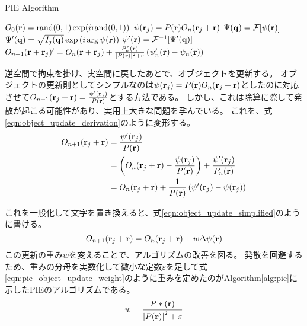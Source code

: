 \begin{algorithm}                      
\caption{PIE Algorithm}         
\label{alg:pie}                          
\begin{algorithmic}
    \STATE $O_0(\mathbf{r}) = \mathrm{rand}(0,1) \exp(i \mathrm{rand}(0,1) )$
        \STATE $\psi(\mathbf{r}_j) = P(\mathbf{r}) O_n(\mathbf{r}_j + \mathbf{r})$
        \STATE $\Psi(\mathbf{q}) = \mathcal F [\psi(\mathbf{r})]$
        \STATE $\Psi'(\mathbf{q}) = \sqrt{I_j(\mathbf{q})} \exp\left( i \arg \psi(\mathbf{r}) \right)$ 
        \STATE $\psi'(\mathbf{r}) = \mathcal F^{-1} [\Psi'(\mathbf{q})]$
        \STATE $O_{n+1}(\mathbf{r} + \mathbf{r}_j)'
          = O_n(\mathbf{r} + \mathbf{r}_j) 
          + \frac{P_n^*(\mathbf{r})}{|P(\mathbf{r})|^2+\varepsilon} \left( \psi_n'(\mathbf{r}) - \psi_n(\mathbf{r}) \right)$
      \ENDFOR
    \ENDFOR
\end{algorithmic}
\end{algorithm}

逆空間で拘束を掛け、実空間に戻したあとで、オブジェクトを更新する。
オブジェクトの更新則としてシンプルなのは$\psi(\mathbf{r}_j) = P(\mathbf{r}) O_n(\mathbf{r}_j + \mathbf{r})$としたのに対応させて$O_{n+1}(\mathbf{r}_j + \mathbf{r}) = \frac{\psi'(\mathbf{r}_j)}{P(\mathbf{r})}$とする方法である。
しかし、これは除算に際して発散が起こる可能性があり、実用上大きな問題を孕んでいる。
これを、式\ref{eqn:object_update_derivation}のように変形する。
\begin{eqnarray}
O_{n+1}(\mathbf{r}_j + \mathbf{r})
  &= \frac{\psi'(\mathbf{r}_j)}{P(\mathbf{r})} \nonumber \\
  &= \left( O_n(\mathbf{r}_j + \mathbf{r}) - \frac{\psi(\mathbf{r}_j)}{P(\mathbf{r})} \right) + \frac{\psi'(\mathbf{r}_j)}{P_n(\mathbf{r})} \nonumber \\
  &= O_n(\mathbf{r}_j + \mathbf{r}) + \frac{1}{P(\mathbf{r})} \left( \psi'(\mathbf{r}_j) - \psi(\mathbf{r}_j) \right) \label{eqn:object_update_derivation}
\end{eqnarray}

これを一般化して文字を置き換えると、式\ref{eqn:object_update_simplified}のように書ける。
\begin{equation}
\label{eqn:object_update_simplified}
  O_{n+1}(\mathbf{r}_j + \mathbf{r}) = O_n(\mathbf{r}_j + \mathbf{r}) + w \Delta\psi(\mathbf{r})
\end{equation}
この更新の重み$w$を変えることで、アルゴリズムの改善を図る。
発散を回避するため、重みの分母を実数化して微小な定数$\varepsilon$を足して式\ref{eqn:pie_object_update_weight}のように重みを定めたのがAlgorithm\ref{alg:pie}に示したPIEのアルゴリズムである。
\begin{equation}
  \label{eqn:pie_object_update_weight}
  w = \frac{P*(\mathbf{r})}{\left| P(\mathbf{r}) \right|^2 + \varepsilon}
\end{equation}

